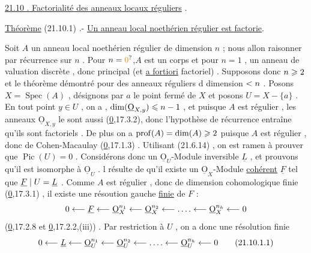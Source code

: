 \uline{21.10 . Factorialité des anneaux locaux réguliers} .

\uline{Théorème} (21.10.1)  .- \uline{Un anneau local noethérien régulier est factorie}.

Soit $A$ un anneau local noethérien régulier de dimension $n$ ; nous allon raisonner par récurrence sur $n$ . Pour $n=\unsure{0}$,$A$ est un corps et pour $n=1$ ,
un anneau de valuation discrète , donc principal (et \uline{a fortiori} factoriel) . Supposons donc $n\geqslant2$ et le théorème démontré pour des anneaux réguliers d dimension $<n$ . Posons $X=\operatorname{Spec}(A)$ , désignons par $a$ le point fermé de $X$ et posons $U=X-\{a\}$ . En tout point $y\in U$ , on a ,
$\dim(\underline{\mathrm O}_{X,y})\leqslant n-1$ , et puisque $A$ est régulier , les anneaux $\underline{\mathrm O}_{X,y}$ le sont aussi (\uline{0},17.3.2), donc l'hypothèse de récurrence entraîne qu'ils sont factoriels . De plus on a $\operatorname{prof}(A)=\dim(A)\geqslant2$ puisque $A$ est régulier , donc de Cohen-Macaulay (\uline{0},17.1.3) . Utilisant (21.6.14) , on est ramen à prouver que $\operatorname{Pic}(U)=0$ . Considérons donc un $\underline{\mathrm O}_U$-Module inversible $\underline L$ , et prouvons qu'il est isomorphe à $\underline{\mathrm O}_U$ .  l résulte de   qu'il existe un $\underline{\mathrm O}_X$-Module \uline{cohérent} $\underline F$ tel que $\underline F\mid U=\underline L$ . Comme $A$ est régulier , donc de dimension cohomologique finie (\uline{0},17.3.1) , il existe une résoution gauche \uline{finie} de $F$ :
\[
0\longleftarrow\underline F\longleftarrow\underline{\mathrm O}_X^{n_1}\longleftarrow\underline{\mathrm O}_X^{n_2}\longleftarrow\mathinner{\ldotp\ldotp\ldotp\ldotp}\longleftarrow\underline{\mathrm O}_X^{n_h}\longleftarrow0
\]
(\uline{0},17.2.8 et \uline{0},17.2.2,(iii)) . Par restriction à $U$ , on a donc une résolution finie
\begingroup\makeatletter\tagsleft@true\makeatother
\[
0\handwritten{\longleftarrow}\underline L\handwritten{\longleftarrow}\underline{\mathrm O}_U^{n_1}\handwritten{\longleftarrow}\underline{\mathrm O}_U^{n_2}\handwritten{\longleftarrow}\mathinner{\ldotp\ldotp\ldotp\ldotp}\handwritten{\longleftarrow}\underline{\mathrm O}_U^{n_h}\handwritten{\longleftarrow}0
\tag*{\handwritten{(21.10.1.1)}}
\]
\endgroup


